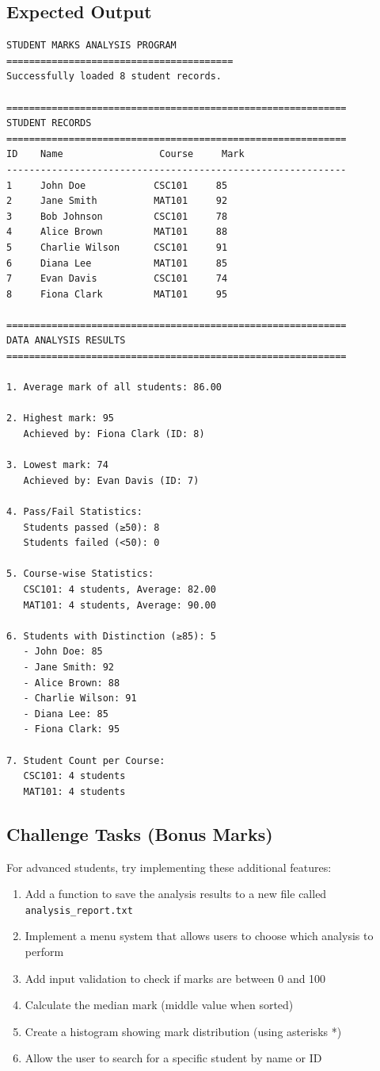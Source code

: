 \documentclass[a4paper,11pt]{article}
\theoremstyle{mytheor}
\begin{document}
\subsection*{Expected Output}

\begin{lstlisting}
STUDENT MARKS ANALYSIS PROGRAM
========================================
Successfully loaded 8 student records.

============================================================
STUDENT RECORDS
============================================================
ID    Name                 Course     Mark 
------------------------------------------------------------
1     John Doe            CSC101     85   
2     Jane Smith          MAT101     92   
3     Bob Johnson         CSC101     78   
4     Alice Brown         MAT101     88   
5     Charlie Wilson      CSC101     91   
6     Diana Lee           MAT101     85   
7     Evan Davis          CSC101     74   
8     Fiona Clark         MAT101     95   

============================================================
DATA ANALYSIS RESULTS
============================================================

1. Average mark of all students: 86.00

2. Highest mark: 95
   Achieved by: Fiona Clark (ID: 8)

3. Lowest mark: 74
   Achieved by: Evan Davis (ID: 7)

4. Pass/Fail Statistics:
   Students passed (≥50): 8
   Students failed (<50): 0

5. Course-wise Statistics:
   CSC101: 4 students, Average: 82.00
   MAT101: 4 students, Average: 90.00

6. Students with Distinction (≥85): 5
   - John Doe: 85
   - Jane Smith: 92
   - Alice Brown: 88
   - Charlie Wilson: 91
   - Diana Lee: 85
   - Fiona Clark: 95

7. Student Count per Course:
   CSC101: 4 students
   MAT101: 4 students
\end{lstlisting}

\subsection*{Challenge Tasks (Bonus Marks)}

For advanced students, try implementing these additional features:

\begin{enumerate}
    \item Add a function to save the analysis results to a new file called \texttt{analysis\_report.txt}
    \item Implement a menu system that allows users to choose which analysis to perform
    \item Add input validation to check if marks are between 0 and 100
    \item Calculate the median mark (middle value when sorted)
    \item Create a histogram showing mark distribution (using asterisks *)
    \item Allow the user to search for a specific student by name or ID
\end{enumerate}
\end{document}
